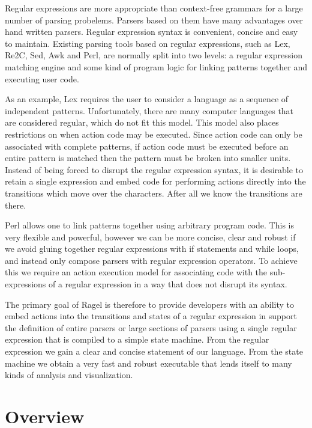 \documentclass[letterpaper,11pt,oneside]{book}
\begin{document}
Regular expressions are more appropriate than context-free grammars for a large
number of parsing probelems. Parsers based on them have many advantages over
hand written parsers. Regular expression syntax is convenient,
concise and easy to maintain. Existing
parsing tools based on regular expressions, such as Lex, Re2C, Sed, Awk and
Perl, are normally split into two levels: a regular expression matching engine
and some kind of program logic for linking patterns together and executing user
code.  

As an example, Lex requires the user to consider a language as a sequence
of independent patterns.
Unfortunately, there are many computer languages that are considered regular,
which do not fit this model. This model also places restrictions on when action
code may be executed. Since action code can only be associated with complete
patterns, if action code must be executed before an entire pattern is matched
then the pattern must be broken into smaller units.  Instead of being forced to
disrupt the regular expression syntax, it is desirable to retain a single
expression and embed code for performing actions directly into the transitions
which move over the characters.  After all we know the transitions are there. 

Perl allows one to link patterns together using arbitrary program code.  This
is very flexible and powerful, however we can be more concise, clear and robust
if we avoid gluing together regular expressions with if statements and while
loops, and instead only compose parsers with regular expression operators.  To
achieve this we require an action execution model for associating code with the
sub-expressions of a regular expression in a way that does not disrupt its
syntax.

The primary goal of Ragel is therefore to provide developers with an ability to embed
actions into the transitions and states of a regular expression in support the
definition of entire parsers or large sections of parsers using a single
regular expression that is compiled to a simple state machine.  From the
regular expression we gain a clear and concise statement of our language. From
the state machine we obtain a very fast and robust executable that lends itself
to many kinds of analysis and visualization.

\section{Overview}
\end{document}
